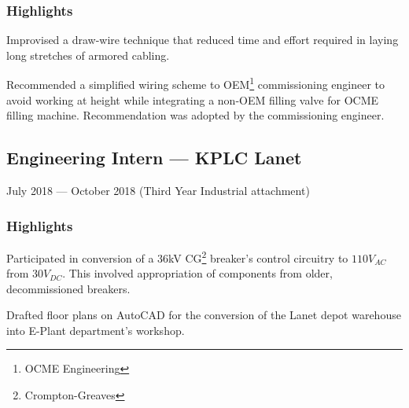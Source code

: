 \documentclass[a4paper,10pt]{article}
\begin{document}
\subsubsection{Highlights}
Improvised a draw-wire technique that reduced time and effort required in laying long stretches of armored cabling.

Recommended a simplified wiring scheme to OEM\footnote{OCME Engineering} commissioning engineer to avoid working at height while integrating a non-OEM filling valve for OCME filling machine. Recommendation was adopted by the commissioning engineer.

\subsection{Engineering Intern --- KPLC Lanet}
July 2018 --- October 2018 (Third Year Industrial attachment)
\subsubsection{Highlights}
Participated in conversion of a 36kV CG\footnote{Crompton-Greaves} breaker's control circuitry to $110V_{AC}$ from $30V_{DC}$. This involved appropriation of components from older, decommissioned breakers.

Drafted floor plans on AutoCAD for the conversion of the Lanet depot warehouse into E-Plant department's workshop.
\end{document}
